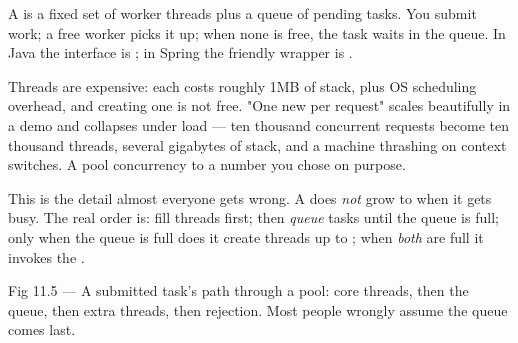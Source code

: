 
 A  is a fixed set of worker threads plus a queue of pending tasks. You submit work; a free worker picks it up; when none is free, the task waits in the queue. In Java the interface is ; in Spring the friendly wrapper is .

 Threads are expensive: each costs roughly 1MB of stack, plus OS scheduling overhead, and creating one is not free. "One new  per request" scales beautifully in a demo and collapses under load --- ten thousand concurrent requests become ten thousand threads, several gigabytes of stack, and a machine thrashing on context switches. A pool  concurrency to a number you chose on purpose.

 This is the detail almost everyone gets wrong. A  does \emph{not} grow to  when it gets busy. The real order is: fill  threads first; then \emph{queue} tasks until the queue is full; only when the queue is full does it create threads up to ; when \emph{both} are full it invokes the .

\begin{wbfigure}{Fig 11.5 --- A submitted task's path through a pool: core threads, then the queue, then extra threads, then rejection. Most people wrongly assume the queue comes last.}
\end{wbfigure}

